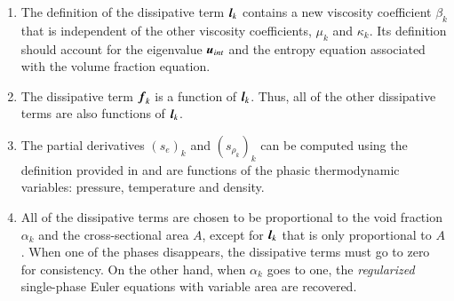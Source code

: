 \documentclass[preprint,10pt]{elsarticle}
\begin{document}
\begin{enumerate}
\item {The definition of the dissipative term $\boldsymbol l_k$ contains a new viscosity
    coefficient $\beta_k$ that is independent of
    the other viscosity coefficients, $\mu_k$ and $\kappa_k$. Its definition should
    account for the eigenvalue $\boldsymbol u_{int}$ and  the entropy equation associated with the volume fraction equation.}

\item {The dissipative term $\boldsymbol f_k$ is a function of $\boldsymbol l_k$. Thus, all of the other
    dissipative terms are also functions of $\boldsymbol l_k$.}

\item {The partial derivatives $(s_e)_k$ and $(s_{\rho_k})_k$ can be computed using the
    definition provided in  and are functions of the phasic thermodynamic
    variables: pressure, temperature and density.}

\item {All of the dissipative terms are chosen to be proportional to the void
    fraction $\alpha_k$ and the cross-sectional area $A$, except for $\boldsymbol l_k$ that is only proportional to $A$. 
When one of the phases disappears, the dissipative terms
    must go to zero for consistency. On the other hand, when $\alpha_k$ goes to one,
    the \emph{regularized} single-phase Euler equations with variable area are recovered. %
		}    


\end{enumerate}
\end{document}
